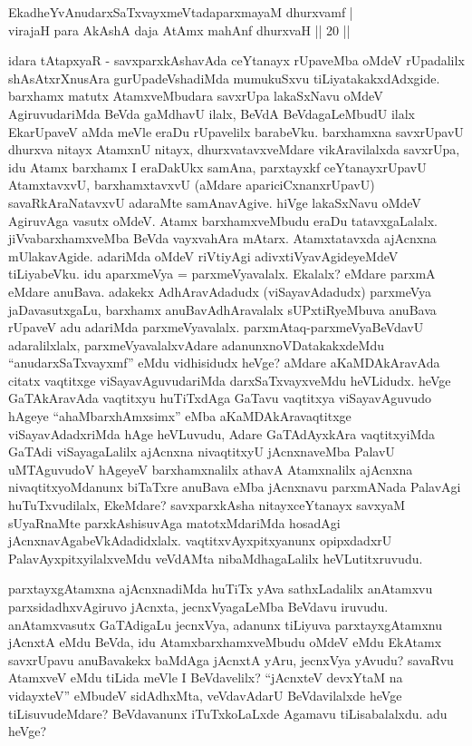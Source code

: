 \begin{shl}
EkadheYvAnudarxSaTxvayxmeVtadaparxmayaM dhurxvamf |\\
virajaH para AkAshA daja AtAmx mahAnf dhurxvaH || 20 ||
\end{shl}

\begin{artha}
idara tAtapxyaR - savxparxkAshavAda ceYtanayx rUpaveMba oMdeV rUpadalilx shAsAtxrXnusAra gurUpadeVshadiMda mumukuSxvu tiLiyatakakxdAdxgide. barxhamx \ndash  matutx AtamxveMbudara savxrUpa lakaSxNavu oMdeV AgiruvudariMda BeVda gaMdhavU ilalx, BeVdA BeVdagaLeMbudU ilalx EkarUpaveV aMda meVle eraDu rUpavelilx barabeVku. barxhamxna savxrUpavU dhurxva nitayx AtamxnU nitayx, dhurxvatavxveMdare vikAravilalxda savxrUpa, idu Atamx barxhamx I eraDakUkx samAna, parxtayxkf ceYtanayxrUpavU AtamxtavxvU, barxhamxtavxvU (aMdare apariciCxnanxrUpavU) savaRkAraNatavxvU adaraMte samAnavAgive. hiVge lakaSxNavu oMdeV AgiruvAga vasutx oMdeV. Atamx barxhamxveMbudu eraDu tatavxgaLalalx. jiVvabarxhamxveMba BeVda vayxvahAra mAtarx. Atamxtatavxda ajAcnxna mUlakavAgide. adariMda oMdeV riVtiyAgi adivxtiVyavAgideyeMdeV tiLiyabeVku. idu aparxmeVya = parxmeVyavalalx. Ekalalx? eMdare parxmA eMdare anuBava. adakekx AdhAravAdadudx (viSayavAdadudx) parxmeVya jaDavasutxgaLu, barxhamx anuBavAdhAravalalx sUPxtiRyeMbuva anuBava rUpaveV adu adariMda parxmeVyavalalx. parxmAtaq-\break parxmeVyaBeVdavU adaralilxlalx, parxmeVyavalalxvAdare adanunx\break noVDatakakxdeMdu ``anudarxSaTxvayxmf'' eMdu vidhisidudx heVge? aMdare aKaMDAkAravAda citatx vaqtitxge viSayavAguvudariMda darxSaTxvayxveMdu heVLidudx. heVge GaTAkAravAda vaqtitxyu huTiTxdAga GaTavu vaqtitxya viSayavAguvudo hAgeye ``ahaMbarxhAmxsimx'' eMba aKaMDAkAravaqtitxge viSayavAdadxriMda hAge heVLuvudu, Adare GaTAdAyxkAra vaqtitxyiMda GaTAdi viSayagaLalilx ajAcnxna nivaqtitxyU jAcnxnaveMba PalavU uMTAguvudoV hAgeyeV barxhamxnalilx athavA Atamxnalilx ajAcnxna nivaqtitxyoMdanunx biTaTxre anuBava eMba jAcnxnavu parxmANada PalavAgi huTuTxvudilalx, EkeMdare? savxparxkAsha nitayxceYtanayx savxyaM sUyaRnaMte parxkAshisuvAga matotxMdariMda hosadAgi jAcnxnavAgabeVkAdadidxlalx. vaqtitxvAyxpitxyanunx opipxdadxrU PalavAyxpitxyilalxveMdu veVdAMta nibaMdhagaLalilx heVLutitxruvudu.

parxtayxgAtamxna ajAcnxnadiMda huTiTx yAva sathxLadalilx anAtamxvu parxsidadhxvAgiruvo jAcnxta, jecnxVyagaLeMba BeVdavu iruvudu. anAtamxvasutx GaTAdigaLu jecnxVya, adanunx tiLiyuva parxtayxgAtamxnu jAcnxtA eMdu BeVda, idu AtamxbarxhamxveMbudu oMdeV eMdu EkAtamx savxrUpavu anuBavakekx baMdAga jAcnxtA yAru, jecnxVya yAvudu?  savaRvu AtamxveV eMdu tiLida meVle I BeVdavelilx? ``jAcnxteV devxYtaM na vidayxteV'' eMbudeV sidAdhxMta, veVdavAdarU BeVdavilalxde heVge tiLisuvudeMdare? BeVdavanunx iTuTxkoLaLxde Agamavu tiLisabalalxdu. adu heVge? 
\end{artha}

